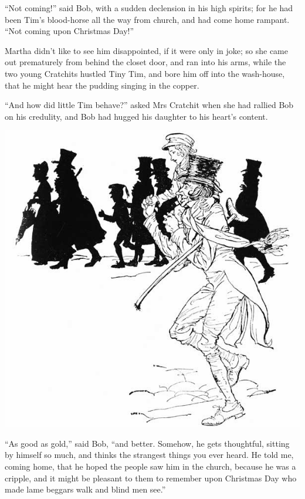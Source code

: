 \documentclass[paper=5.5in:8.5in,BCOR=10mm,twoside,DIV=15,12pt,usegeometry,openany]{scrbook} %
\begin{document}
\enquote{Not coming!} said Bob, with a sudden declension in his high spirits; for he had been Tim's blood-horse all the way from church, and had come home rampant. \enquote{Not coming upon Christmas Day!}

Martha didn't like to see him disappointed, if it were only in joke; so she came out prematurely from behind the closet door, and ran into his arms, while the two young Cratchits hustled Tiny Tim, and bore him off into the wash-house, that he might hear the pudding singing in the copper.

\enquote{And how did little Tim behave?} asked Mrs Cratchit when she had rallied Bob on his credulity, and Bob had hugged his daughter to his heart's content.


 \begin{center}
     \vfill%
     \includegraphics[width=\columnwidth]{gs109b}
 \end{center}




\enquote{As good as gold,} said Bob, \enquote{and better. Somehow, he gets thoughtful, sitting by himself so much, and thinks the strangest things you ever heard. He told me, coming home, that he hoped the people saw him in the church, because he was a cripple, and it might be pleasant to them to remember upon Christmas Day who made lame beggars walk and blind men see.}
\end{document}
